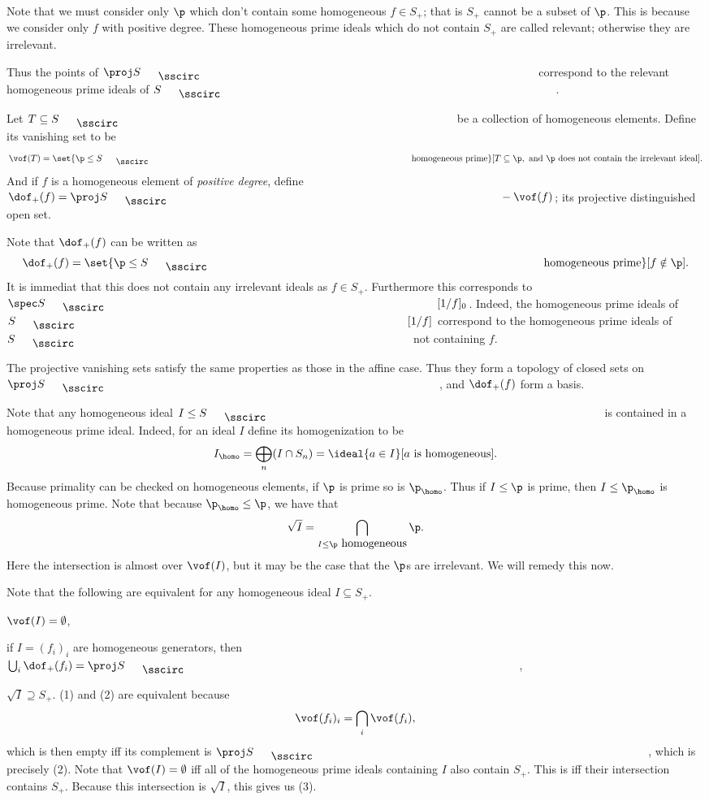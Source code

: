Note that we must consider only $\p$ which don't contain some homogeneous $f\in S_+$; that is $S_+$ cannot be a subset of $\p$.
This is because we consider only $f$ with positive degree.
These homogeneous prime ideals which do not contain $S_+$ are called {\emphcolor relevant}; otherwise they are {\emphcolor irrelevant}.

Thus the points of $\proj S_\bul$ correspond to the relevant homogeneous prime ideals of $S_\bul$.

\bdefn

    Let $T\subseteq S_\bul$ be a collection of homogeneous elements.
    Define its {\emphcolor vanishing set} to be
    $$ \vof(T) = \set{\p\leq S_\bul\hbox{ homogeneous prime}}[T\subseteq\p,\hbox{ and $\p$ does not contain the irrelevant ideal}] . $$
    And if $f$ is a homogeneous element of {\it positive degree\/}, define $\dof_+(f)=\proj S_\bul-\vof(f)$; its {\emphcolor projective distinguished open set}.

\edefn

Note that $\dof_+(f)$ can be written as
$$ \dof_+(f) = \set{\p\leq S_\bul\hbox{ homogeneous prime}}[f\notin\p] . $$
It is immediat that this does not contain any irrelevant ideals as $f\in S_+$.
Furthermore this corresponds to $\spec S_\bul[1/f]_0$.
Indeed, the homogeneous prime ideals of $S_\bul[1/f]$ correspond to the homogeneous prime ideals of $S_\bul$ not containing $f$.

The projective vanishing sets satisfy the same properties as those in the affine case.
Thus they form a topology of closed sets on $\proj S_\bul$, and $\dof_+(f)$ form a basis.

Note that any homogeneous ideal $I\leq S_\bul$ is contained in a homogeneous prime ideal.
Indeed, for an ideal $I$ define its {\emphcolor homogenization} to be
$$ I_\homo = \bigoplus_n(I\cap S_n) = \ideal{a\in I}[\hbox{$a$ is homogeneous}] . $$
Because primality can be checked on homogeneous elements, if $\p$ is prime so is $\p_\homo$.
Thus if $I\leq\p$ is prime, then $I\leq\p_\homo$ is homogeneous prime.
Note that because $\p_\homo\leq\p$, we have that
$$ \sqrt I = \bigcap_{I\leq\p\hbox{ homogeneous}}\p . $$
Here the intersection is almost over $\vof(I)$, but it may be the case that the $\p$s are irrelevant.
We will remedy this now.

Note that the following are equivalent for any homogeneous ideal $I\subseteq S_+$.
\benum
    \item $\vof(I)=\emptyset$,
    \item if $I=(f_i)_i$ are homogeneous generators, then $\bigcup_i\dof_+(f_i)=\proj S_\bul$,
    \item $\sqrt I\supseteq S_+$.
\eenum
(1) and (2) are equivalent because
$$ \vof(f_i)_i = \bigcap_i\vof(f_i) , $$
which is then empty iff its complement is $\proj S_\bul$, which is precisely (2).
Note that $\vof(I)=\emptyset$ iff all of the homogeneous prime ideals containing $I$ also contain $S_+$.
This is iff their intersection contains $S_+$.
Because this intersection is $\sqrt I$, this gives us (3).

